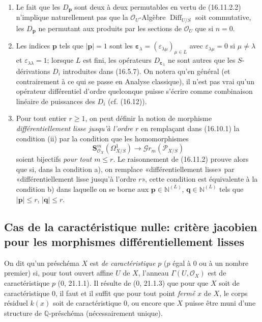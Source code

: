 \begin{remarks}[16.11.3]
\begin{enumerate}
  \item[(i)] Le fait que les $D_{\mathbf{p}}$ sont deux à deux permutables en
  vertu de (16.11.2.2) n'implique naturellement pas que la
  $\mathcal{O}_U$-Algèbre $\operatorname{Diff}_{U/S}$ soit commutative, les
  $D_{\mathbf{p}}$ ne permutant aux produits par les sections de
  $\mathcal{O}_U$ que si $n=0$.
  \item[(ii)] Les indices $\mathbf{p}$ tels que $|\mathbf{p}|=1$ sont les
  $\boldsymbol{\varepsilon}_\lambda
  =(\varepsilon_{\lambda\mu})_{\mu\in L}$ avec
  $\varepsilon_{\lambda\mu}=0$ si $\mu\neq\lambda$ et
  $\varepsilon_{\lambda\lambda}=1$; lorsque $L$ est fini, les opérateurs
  $D_{\boldsymbol{\varepsilon}_\lambda}$ ne sont autres que les
  $S$-dérivations $D_i$ introduites dans (16.5.7). On notera qu'en général
  (et contrairement à ce qui se passe en Analyse classique), il n'est pas
  vrai qu'un opérateur différentiel d'ordre quelconque puisse s'écrire comme
  combinaison linéaire de puissances des $D_i$ (cf. (16.12)).
  \item[(iii)] Pour tout entier $r\geq1$, on peut définir la notion de
  morphisme \emph{différentiellement lisse jusqu'à l'ordre $r$} en remplaçant
  dans (16.10.1) la condition (ii) par la condition que les homomorphismes
  \[
    \mathbf{S}_{\mathcal{O}_X}^m(\Omega_{X/S}^1)
    \longrightarrow\mathscr{G}r_m(\mathscr{P}_{X/S})
  \]
  soient bijectifs \emph{pour tout $m\leq r$}. Le raisonnement de (16.11.2)
  prouve alors que si, dans la condition a), on remplace «différentiellement
  lisse» par «différentiellement lisse jusqu'à l'ordre $r$», cette condition
  est équivalente à la condition b) dans laquelle on se borne aux
  $\mathbf{p}\in\mathbb{N}^{(L)}$, $\mathbf{q}\in\mathbb{N}^{(L)}$ tels que
  $|\mathbf{p}|\leq r$, $|\mathbf{q}|\leq r$.
\end{enumerate}
\end{remarks}

\subsection{Cas de la caractéristique nulle: critère jacobien pour les
morphismes différentiellement lisses}

\begin{env}[16.12.1]
On dit qu'un préschéma $X$ est \emph{de caractéristique $p$} ($p$ égal à $0$
ou à un nombre premier) si, pour tout ouvert affine $U$ de $X$, l'anneau
$\Gamma(U,\mathcal{O}_X)$ est de caractéristique $p$ (0, 21.1.1). Il résulte
de (0, 21.1.3) que pour que $X$ soit de caractéristique $0$, il faut et il
suffit que pour tout point \emph{fermé} $x$ de $X$, le corps résiduel $k(x)$
soit de caractéristique $0$, ou encore que $X$ puisse être muni d'une
structure de $\mathbb{Q}$-préschéma (nécessairement unique).
\end{env}

